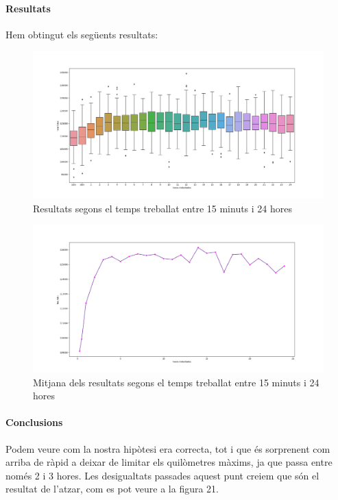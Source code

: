 \documentclass[a4paper]{article}
\begin{document}
\paragraph{Resultats} Hem obtingut els següents resultats:

\begin{figure}[htp]
\centering
\includegraphics[scale=0.35]{images/experiment7-1.png}
\caption{Resultats segons el temps treballat entre 15 minuts i 24 hores}
\centering
\end{figure}

\begin{figure}[htp]
\centering
\includegraphics[scale=0.35]{images/experiment7-2.png}
\caption{Mitjana dels resultats segons el temps treballat entre 15 minuts i 24 hores}
\centering
\end{figure}

\newpage
\paragraph{Conclusions} Podem veure com la nostra hipòtesi era correcta, tot i que és sorprenent com arriba de ràpid a deixar de limitar els quilòmetres màxims, ja que passa entre només 2 i 3 hores. Les desigualtats passades aquest punt creiem que són el resultat de l'atzar, com es pot veure a la figura 21.
\end{document}
